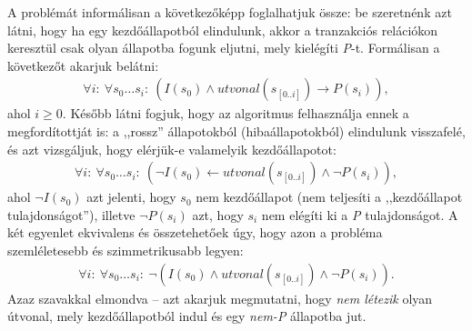 A problémát informálisan a következőképp foglalhatjuk össze: be szeretnénk azt látni, hogy ha egy kezdőállapotból elindulunk, akkor a tranzakciós relációkon keresztül csak olyan állapotba fogunk eljutni, mely kielégíti \emph{P}-t. Formálisan a következőt akarjuk belátni:
\begin{align}
	\forall i:~\forall s_{0} \dots s_{i}:~(I(s_{0}) \wedge \mathit{utvonal}(s_{[0..i]}) \rightarrow P(s_{i})),
\end{align}
ahol $i \geq 0$. Később látni fogjuk, hogy az algoritmus felhasználja ennek a megfordítottját is: a ,,rossz'' állapotokból (hibaállapotokból) elindulunk visszafelé, és azt vizsgáljuk, hogy elérjük-e valamelyik kezdőállapotot:
\begin{align}
	\forall i:~\forall s_{0} \dots s_{i}:~(\neg I(s_{0}) \leftarrow \mathit{utvonal}(s_{[0..i]}) \wedge \neg P(s_{i})),
\end{align}
ahol $\neg I(s_{0})$ azt jelenti, hogy $s_{0}$ nem kezdőállapot (nem teljesíti a ,,kezdőállapot tulajdonságot''), illetve $\neg P(s_{i})$ azt, hogy $s_{i}$ nem elégíti ki a \emph{P} tulajdonságot. A két egyenlet ekvivalens és összetehetőek úgy, hogy azon a probléma szemléletesebb és szimmetrikusabb legyen:
\begin{align}
	\forall i:~\forall s_{0} \dots s_{i}:~\neg(I(s_{0}) \wedge \mathit{utvonal}(s_{[0..i]}) \wedge \neg P(s_{i})).
\end{align}
Azaz szavakkal elmondva -- azt akarjuk megmutatni, hogy \emph{nem létezik} olyan útvonal, mely kezdőállapotból indul és egy \emph{nem-P} állapotba jut.